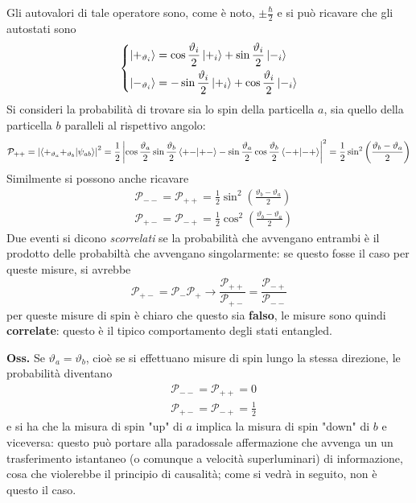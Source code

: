 Gli autovalori di tale operatore sono, come è noto, $\pm\frac{\hbar}{2}$ e si può ricavare che
gli autostati sono
$$\begin{dcases}
      \ket{+_{\vartheta_i}} = \cos\frac{\vartheta_i}{2}\ket{+_i} +\sin\frac{\vartheta_i}{2}\ket{-_i}\\
      \ket{-_{\vartheta_i}}=-\sin\frac{\vartheta_i}{2}\ket{+_i}+\cos\frac{\vartheta_i}{2}\ket{-_i}
\end{dcases}$$
Si consideri la probabilità di trovare sia lo spin della particella $a$, sia quello della particella
$b$ paralleli al rispettivo angolo:
\begin{gather*}
\mathcal{P}_{++} = \left|\bra{+_{\vartheta_a}+_{\vartheta_b}}\ket{\psi_{ab}}\right|^2=
\frac{1}{2}\left|\cos\frac{\vartheta_a}{2}\sin\frac{\vartheta_b}{2}\bra{+-}\ket{+-}-
\sin\frac{\vartheta_a}{2}\cos\frac{\vartheta_b}{2}\bra{-+}\ket{-+}\right|^2=\frac{1}{2}\sin^2\left(
\frac{\vartheta_b-\vartheta_a}{2}\right)
\end{gather*}
Similmente si possono anche ricavare
\begin{align*}
&\mathcal{P}_{--}=\mathcal{P}_{++}=\frac{1}{2}\sin^2\left(\frac{\vartheta_b-\vartheta_a}{2}\right)\\
&\mathcal{P}_{+-}=\mathcal{P}_{-+}=\frac{1}{2}\cos^2\left(\frac{\vartheta_b-\vartheta_a}{2}\right)
\end{align*}
Due eventi si dicono \textit{scorrelati} se la probabilità che avvengano entrambi è
il prodotto delle probabiltà che avvengano singolarmente: se questo fosse il caso per queste misure,
si avrebbe
$$\mathcal{P}_{+-}=\mathcal{P}_-\mathcal{P}_+\rightarrow
\frac{\mathcal{P}_{++}}{\mathcal{P}_{+-}}=\frac{\mathcal{P_{-+}}}{\mathcal{P}_{--}}$$
per queste misure di spin è chiaro che questo sia \textbf{falso}, le misure sono quindi
\textbf{correlate}: questo è il tipico comportamento degli stati entangled.

\textbf{Oss.} Se $\vartheta_a=\vartheta_b$, cioè se si effettuano misure di spin lungo la stessa
direzione, le probabilità diventano
\begin{align*}
&\mathcal{P}_{--}=\mathcal{P}_{++}=0\\
&\mathcal{P}_{+-}=\mathcal{P}_{-+}=\frac{1}{2}
\end{align*}
e si ha che la misura di spin "up" di $a$ implica la misura di spin "down" di $b$ e viceversa:
questo può portare alla paradossale affermazione che avvenga un un trasferimento istantaneo
(o comunque a velocità superluminari) di informazione, cosa che violerebbe il principio di causalità;
come si vedrà in seguito, non è questo il caso.
